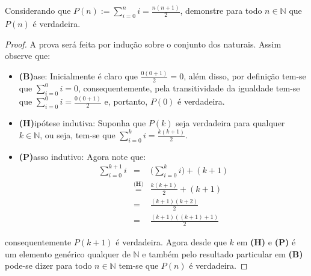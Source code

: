 \begin{exemplo}\label{exe:InducaoFraca3}
	Considerando que $\displaystyle P(n) := \sum_{i = 0}^{n} i = \frac{n(n+1)}{2}$, demonstre para todo $n \in \mathbb{N}$ que $P(n)$ é verdadeira.
	
	\begin{proof}
		A prova será feita por indução sobre o conjunto dos naturais. Assim observe que:
		\begin{itemize}
			\item[ ] \textbf{(B)}ase: Inicialmente é claro que $\frac{0(0+1)}{2} = 0$, além disso, por definição tem-se que $\displaystyle \sum_{i=0}^{0} i = 0$, consequentemente, pela transitividade da igualdade tem-se que  $\displaystyle\sum_{i = 0}^{0} i = \frac{0(0+1)}{2}$ e, portanto, $P(0)$ é verdadeira.
			\item[ ] \textbf{(H)}ipótese indutiva: Suponha que $P(k)$ seja verdadeira para qualquer $k \in \mathbb{N}$, ou seja, tem-se que $\displaystyle\sum_{i = 0}^{k} i = \frac{k(k+1)}{2}$.
			\item[ ] \textbf{(P)}asso indutivo:  Agora note que:
			\begin{eqnarray*}
				\sum_{i = 0}^{k+1} i & = & \Big(\sum_{i = 0}^{k} i\Big) + (k+1)\\
				& \stackrel{\textbf{(H)}}{=} & \frac{k(k+1)}{2} + (k+1)\\
				& = & \frac{(k+1)(k + 2)}{2}\\
				& = & \frac{(k+1)((k+1) + 1)}{2}
			\end{eqnarray*}
		\end{itemize}
		consequentemente $P(k + 1)$ é verdadeira. Agora desde que $k$ em \textbf{(H)} e \textbf{(P)} é um elemento genérico qualquer de $\mathbb{N}$ e também pelo resultado particular em  \textbf{(B)} pode-se dizer para todo $n \in \mathbb{N}$ tem-se que $P(n)$ é verdadeira.
	\end{proof}
\end{exemplo}

